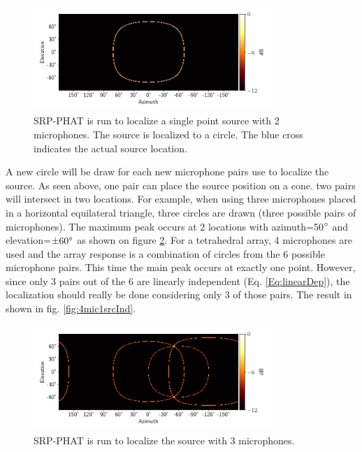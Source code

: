 \begin{figure}[H]
    \centering
    \includegraphics[width=0.8\textwidth]{Figures/2mic1srcRes.png}
    \caption{SRP-PHAT is run to localize a single point source with 2 microphones. The source is localized to a circle. The blue cross indicates the actual source location.}
    \label{fig:2mic1src}
\end{figure}
A new circle will be draw for each new microphone pairs use to localize the source. As seen above, one pair can place the source position on a cone. two pairs will intersect in two locations. For example, when using three microphones placed in a horizontal equilateral triangle, three circles are drawn (three possible pairs of microphones). The maximum peak occurs at 2 locations with azimuth=50$\degree$ and elevation=$\pm 60\degree$ as shown on figure \ref{fig:3mic1src}. For a tetrahedral array, 4 microphones are used and the array response is a combination of circles from the 6 possible microphone pairs. This time the main peak occurs at exactly one point.  However, since only 3 pairs out of the 6 are linearly independent (Eq. \ref{Eq:linearDep}), the localization should really be done considering only 3 of those pairs. The result in shown in fig. \ref{fig:4mic1srcInd}.
\begin{figure}[H]
    \centering
    \includegraphics[width=0.8\textwidth]{Figures/3mic1srcRes.png}
    \caption{SRP-PHAT is run to localize the source with 3 microphones.}
    \label{fig:3mic1src}
\end{figure}

